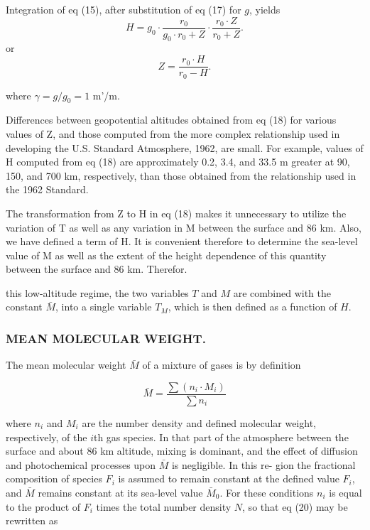 \documentclass{article}
\begin{document}
Integration of eq (15), after substitution of eq (17) for $g$, yields
\begin{equation}
 H = g_0 \cdot \frac{r_0}{g_0 \cdot r_0 + Z} \cdot \frac{r_0 \cdot Z}{r_0 + Z}. \tag{18}
\end{equation}
or
\begin{equation}
 Z = \frac{r_0 \cdot H}{r_0 - H}. \tag{19}
\end{equation}

where $\gamma = g/g_0 = 1$ m'/m.

Differences between geopotential altitudes obtained from eq (18) for various values of Z, and those computed from the more complex relationship used in developing the U.S. Standard Atmosphere, 1962, are small. For example, values of H computed from eq (18) are approximately 0.2, 3.4, and 33.5 m greater at 90, 150, and 700 km, respectively, than those obtained from the relationship used in the 1962 Standard.

The transformation from Z to H in eq (18) makes it unnecessary to utilize the variation of T as well as any variation in M between the surface and 86 km. Also, we have defined a term of H. It is convenient therefore to determine the sea-level value of M as well as the extent of the height dependence of this quantity between the surface and 86 km. Therefor.

\noindent this low-altitude regime, the two variables $T$ and $M$ are combined with the constant $\bar{M}$, into a single variable $T_M$, which is then defined as a function of $H$.

\subsubsection{MEAN MOLECULAR WEIGHT.}
The mean molecular weight $\bar{M}$ of a mixture of gases is by definition

\begin{equation}
 \bar{M} = \frac{\sum (n_i \cdot M_i)}{\sum n_i} \tag{20}
\end{equation}

where $n_i$ and $M_i$ are the number density and defined molecular weight, respectively, of the $i$th gas species. In that part of the atmosphere between the surface and about 86 km altitude, mixing is dominant, and the effect of diffusion and photochemical processes upon $\bar{M}$ is negligible. In this re- gion the fractional composition of species $F_i$ is assumed to remain constant at the defined value $F_i$, and $\bar{M}$ remains constant at its sea-level value $\bar{M}_0$. For these conditions $n_i$ is equal to the product of $F_i$ times the total number density $N$, so that eq (20) may be rewritten as
\end{document}
